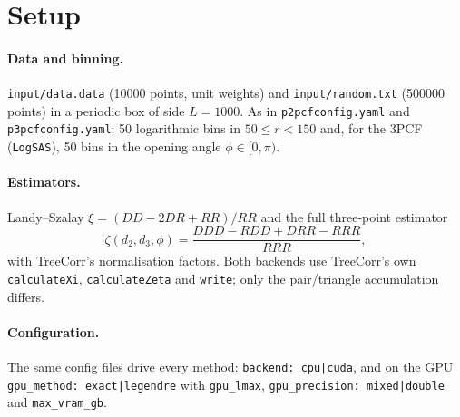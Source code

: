 \documentclass[11pt,a4paper]{article}
\begin{document}
\section{Setup}
\paragraph{Data and binning.} \texttt{input/data.data} (\num{10000} points, unit weights) and
\texttt{input/random.txt} (\num{500000} points) in a periodic box of side $L=1000$. As in
\texttt{p2pcfconfig.yaml} and \texttt{p3pcfconfig.yaml}: 50 logarithmic bins in $50\le r<150$ and,
for the 3PCF (\texttt{LogSAS}), 50 bins in the opening angle $\phi\in[0,\pi)$.

\paragraph{Estimators.} Landy--Szalay $\xi=(DD-2DR+RR)/RR$ and the full three-point estimator
\begin{equation}
  \zeta(d_2,d_3,\phi)=\frac{DDD-RDD+DRR-RRR}{RRR},
\end{equation}
with TreeCorr's normalisation factors. Both backends use TreeCorr's own \texttt{calculateXi},
\texttt{calculateZeta} and \texttt{write}; only the pair/triangle accumulation differs.

\paragraph{Configuration.} The same config files drive every method:
\texttt{backend: cpu|cuda}, and on the GPU \texttt{gpu\_method: exact|legendre} with
\texttt{gpu\_lmax}, \texttt{gpu\_precision: mixed|double} and \texttt{max\_vram\_gb}.
\end{document}
